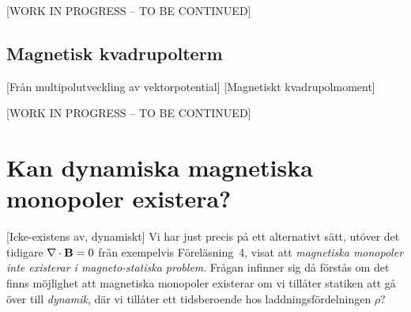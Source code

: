 \centerline{[WORK IN PROGRESS -- TO BE CONTINUED]}



\subsection{Magnetisk kvadrupolterm}
[Fr{\aa}n multipolutveckling av
  vektorpotential]
[Magnetiskt kvadrupolmoment]

\centerline{[WORK IN PROGRESS -- TO BE CONTINUED]}

\vfill\eject

\section{Kan dynamiska magnetiska monopoler existera?}
[Icke-existens av, dynamiskt]
Vi har just precis p{\aa} ett alternativt s{\"a}tt, ut{\"o}ver det tidigare
$\nabla\cdot{\bf B}=0$ fr{\aa}n exempelvis F{\"o}rel{\"a}sning~4, visat att
{\it magnetiska monopoler inte existerar i magneto-statiska problem}.%
Fr{\aa}gan infinner sig d{\aa} f{\"o}rst{\aa}s om det finns m{\"o}jlighet att
magnetiska monopoler existerar om vi till{\aa}ter statiken att g{\aa} {\"o}ver
till {\it dynamik}, d{\"a}r vi till{\aa}ter ett tidsberoende hos
laddningsf{\"o}rdelningen $\rho$?

